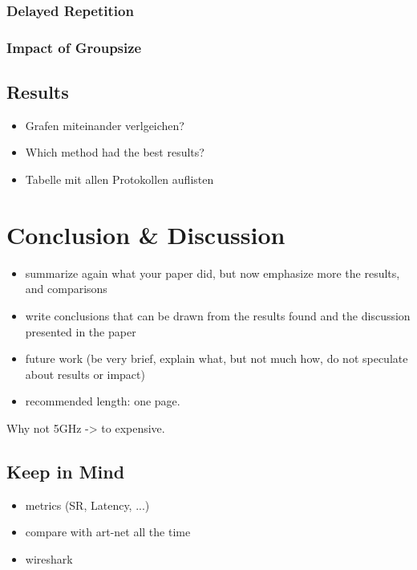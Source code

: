 \subsection*{Delayed Repetition}
\subsection*{Impact of Groupsize}

\section{Results}
\begin{itemize}
	\item Grafen miteinander verlgeichen?
	\item Which method had the best results?
	\item Tabelle mit allen Protokollen auflisten 
\end{itemize}

\chapter{Conclusion \& Discussion}
\begin{itemize}
\item summarize again what your paper did, but now emphasize more the results, and comparisons
\item write conclusions that can be drawn from the results found and the discussion presented in the paper
\item future work (be very brief, explain what, but not much how, do not speculate about results or impact)
\item recommended length: one page.
\end{itemize}

Why not 5GHz -> to expensive.\\


\section*{Keep in Mind}
\begin{itemize}
\item metrics (SR, Latency, ...)
\item compare with art-net all the time
\item wireshark
\end{itemize}